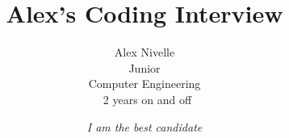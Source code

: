 \title{Alex's Coding Interview}
\author{Alex Nivelle \\ Junior \\ Computer Engineering \\ ~2 years on and off}

\date{\small\emph{I am the best candidate}}

\maketitle
